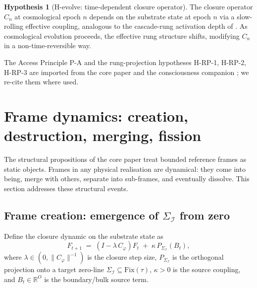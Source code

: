 \documentclass[11pt]{article}
\theoremstyle{plain}
\theoremstyle{definition}
\newtheorem{hypothesis}[theorem]{Hypothesis}
\theoremstyle{remark}
\newcommand{\Fix}{\mathrm{Fix}}
\newcommand{\Ical}{\mathcal{I}}
\newcommand{\Cph}{C_\varphi}
\begin{document}
\begin{hypothesis}[H-evolve: time-dependent closure operator]\label{hyp:h-evolve}
The closure operator $C_n$ at cosmological epoch $n$ depends on the substrate state at epoch $n$ via a slow-rolling effective coupling, analogous to the cascade-rung activation depth of \citet{SmartHypersphereCosmology}. As cosmological evolution proceeds, the effective rung structure shifts, modifying $C_n$ in a non-time-reversible way.
\end{hypothesis}

The Access Principle P-A and the rung-projection hypotheses H-RP-1, H-RP-2, H-RP-3 are imported from the core paper and the consciousness companion \citep{SmartProcessingToPOV}; we re-cite them where used.

\section{Frame dynamics: creation, destruction, merging, fission}\label{sec:frame-dynamics}

The structural propositions of the core paper treat bounded reference frames as static objects. Frames in any physical realisation are dynamical: they come into being, merge with others, separate into sub-frames, and eventually dissolve. This section addresses these structural events.

\subsection{Frame creation: emergence of $\Sigma_\Ical$ from zero}

Define the closure dynamic on the substrate state as
\begin{equation}\label{eq:closure-dyn}
  F_{t+1} \;=\; (I - \lambda \, \Cph) F_t \;+\; \kappa \, P_{\Sigma_\Ical}(B_t),
\end{equation}
where $\lambda \in (0, \|\Cph\|^{-1})$ is the closure step size, $P_{\Sigma_\Ical}$ is the orthogonal projection onto a target zero-line $\Sigma_\Ical \subseteq \Fix(\tau)$, $\kappa > 0$ is the source coupling, and $B_t \in \mathbb{R}^O$ is the boundary/bulk source term.
\end{document}
